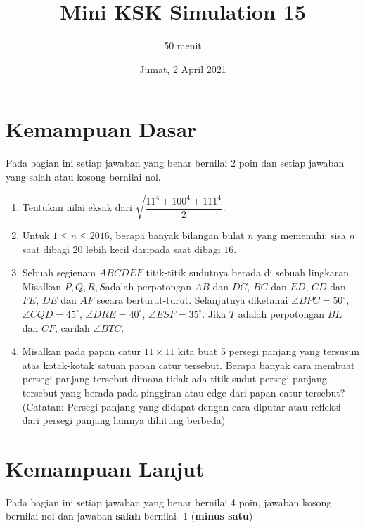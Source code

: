 \documentclass{article}
\title{Mini KSK Simulation 15}
\author{50 menit}
\date{Jumat, 2 April 2021}
\begin{document}
	\maketitle
	
	\section{Kemampuan Dasar}
	Pada bagian ini setiap jawaban yang benar bernilai 2 poin dan setiap jawaban yang salah
	atau kosong bernilai nol.
	\begin{enumerate}
		\item Tentukan nilai eksak dari $\sqrt{\dfrac{11^4+100^4+111^4}{2}}$.
		
		\item Untuk $1\leq n\leq 2016$, berapa banyak bilangan bulat $n$ yang memenuhi: sisa $n$ saat dibagi $20$ lebih kecil daripada saat dibagi $16$.
		
		\item Sebuah segienam $ABCDEF$ titik-titik sudutnya berada di sebuah lingkaran. Misalkan $P, Q, R, S$adalah perpotongan $AB$ dan $DC$, $BC$ dan $ED$, $CD$ dan $FE$, $DE$ dan $AF$ secara berturut-turut. Selanjutnya diketahui $\angle BPC=50^{\circ}$, $\angle CQD=45^{\circ}$, $\angle DRE=40^{\circ}$, $\angle ESF=35^{\circ}$.
		Jika $T$ adalah perpotongan $BE$ dan $CF$, carilah $\angle BTC$.
		
		\item Misalkan pada papan catur $11 \times 11$ kita buat 5 persegi panjang yang tersusun atas kotak-kotak satuan papan catur tersebut. Berapa banyak cara membuat persegi panjang tersebut dimana tidak ada titik sudut persegi panjang tersebut yang berada pada pinggiran atau edge dari papan catur tersebut? (Catatan: Persegi panjang yang didapat dengan cara diputar atau refleksi dari persegi panjang lainnya dihitung berbeda)
	\end{enumerate}

\section{Kemampuan Lanjut}
Pada bagian ini setiap jawaban yang benar bernilai 4 poin, jawaban kosong bernilai nol
dan jawaban \textbf{salah} bernilai -1 (\textbf{minus satu})
\end{document}
